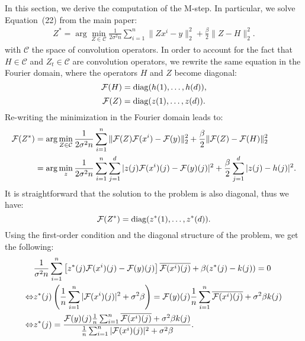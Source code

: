 In this section, we derive the computation of the M-step. In particular, we solve Equation~(22) from the main paper:
\begin{align}
Z^* = \arg\min_{Z\in \mathcal{C}} \frac{1}{2\sigma^2 n}\sum_{i=1}^n{\|Z x^i -y\|_2^2} + \frac{\beta}{2}\|Z-H\|_2^2.
\end{align}
with $\mathcal{C}$ the space of convolution operators. 
\newline
In order to account for the fact that $H \in \mathcal{C}$ and $Z_t \in \mathcal{C}$ are convolution operators, we rewrite the same equation in the Fourier domain, where the operators $H$ and $Z$ become diagonal:
\begin{equation}
{\mathcal{F}(H)} = \operatorname{diag}(h(1),\dots,h(d)),
\end{equation}
%
\begin{equation}
{\mathcal{F}(Z)} = \operatorname{diag}(z(1),\dots,z(d)).
\end{equation}
%
Re-writing the minimization in the Fourier domain leads to:
\begin{align}
\label{eq:Mstep_appendix_1}
{\mathcal{F}(Z^*)} & = \arg\min_{Z\in\mathcal{C}} \frac{1}{2\sigma^2 n}\sum_{i=1}^n{\|{\mathcal{F}(Z)} {\mathcal{F}(x^i)} -{\mathcal{F}(y)}\|_2^2} + \frac{\beta}{2}\|{\mathcal{F}(Z)}-{\mathcal{F}(H)}\|_2^2 \\
& = \arg\min_{z} \frac{1}{2\sigma^2 n}\sum_{i=1}^n{\sum_{j=1}^d{|z(j) {\mathcal{F}(x^i)}(j) - {\mathcal{F}(y)}(j)|^2}} + \frac{\beta}{2}\sum_{j=1}^d{|z(j) - h(j)|^2}.
\end{align}
It is straightforward that the solution to the problem is also diagonal, thus we have:
\begin{equation}
{\mathcal{F}(Z^*)} = \operatorname{diag}(z^*(1),\dots,z^*(d)).
\end{equation}
Using the first-order condition and the diagonal structure of the problem, we get the following:
\begin{align}
& \frac{1}{\sigma^2 n}\sum_{i=1}^n{\left[z^*(j) {\mathcal{F}(x^i)}(j) -{\mathcal{F}(y)}(j)\right]\overline{{\mathcal{F}(x^i)}(j)}} + \beta (z^*(j) - k(j)) = 0 \\
\Leftrightarrow & z^*(j) \left(\frac{1}{n}\sum_{i=1}^n{|{\mathcal{F}(x^i)}(j)|^2} + \sigma^2 \beta\right) = {\mathcal{F}(y)}(j)\frac{1}{n}\sum_{i=1}^n{\overline{{\mathcal{F}(x^i)}(j)}} + \sigma^2 \beta k(j) \\
\Leftrightarrow & z^*(j) = \frac{{\mathcal{F}(y)}(j)\frac{1}{n}\sum_{i=1}^n{\overline{{\mathcal{F}(x^i)}(j)}} + \sigma^2 \beta k(j)}{\frac{1}{n}\sum_{i=1}^n{|{\mathcal{F}(x^i)}(j)|^2} + \sigma^2 \beta}.
\end{align}

